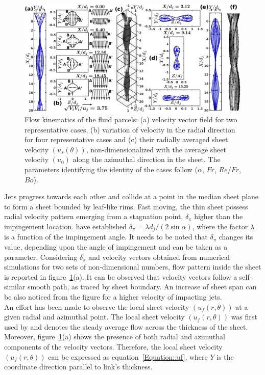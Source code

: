 \documentclass[%
 aip,
 sd,%
amsmath,amssymb,
preprint,%
author-year,%
]{revtex4-1}
\begin{document}
\begin{figure}
	\centering
	\includegraphics[width=\linewidth]{Figure5}
	\caption{Flow kinematics of the fluid parcels: (a) velocity vector field for two representative cases, (b) variation of velocity in the radial direction for four representative cases and (c) their radially averaged sheet velocity $\left(u_s(\theta)\right)$, non-dimensionalized with the average sheet velocity $\left(u_0\right)$ along the azimuthal direction in the sheet. The parameters identifying the identity of the cases follow ($\alpha$, $Fr$, $Re/Fr$, $Bo$).}
	\label{Figure::velocityVectors}%
\end{figure}
Jets progress towards each other and collide at a point in the median sheet plane to form a sheet bounded by leaf-like rims. Fast moving, the thin sheet possess radial velocity pattern emerging from a stagnation point, $\delta_\pi$ higher than the impingement location. \cite{inamura2014effect} have established $\delta_\pi = \lambda d_j/(2\sin\alpha)$, where the factor $\lambda$ is a function of the impingement angle. It needs to be noted that $\delta_\pi$ changes its value, depending upon the angle of impingement and can be taken as a parameter. Considering $\delta_\pi$ and velocity vectors obtained from numerical simulations for two sets of non-dimensional numbers, flow pattern inside the sheet is reported in figure~\ref{Figure::velocityVectors}(a). It can be observed that velocity vectors follow a self-similar smooth path, as traced by sheet boundary. An increase of sheet span can be also noticed from the figure for a higher velocity of impacting jets.\\
An effort has been made to observe the local sheet velocity $\left(u_f(r,\theta)\right)$ at a given radial and azimuthal point. The local sheet velocity $\left(u_f(r,\theta)\right)$ was first used by \cite{choo2002velocity} and denotes the steady average flow across the thickness of the sheet. Moreover, figure~\ref{Figure::velocityVectors}(a) shows the presence of both radial and azimuthal components of the velocity vectors. Therefore, the local sheet velocity $\left(u_f(r,\theta)\right)$ can be expressed as equation~\ref{Equation::uf}, where $Y$ is the coordinate direction parallel to link's thickness.
\end{document}
